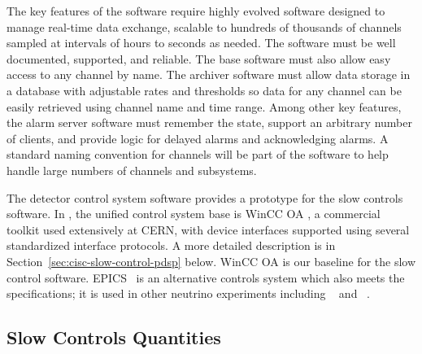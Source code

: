 The key features of the software require highly evolved software designed to manage real-time data exchange, scalable
to hundreds of thousands of channels sampled at intervals of hours to seconds as needed. The software
must be well documented, supported, and reliable. The base
software must also allow easy access to any channel by name. The
archiver software must allow data storage in a database with
adjustable rates and thresholds so data
for any channel can be easily retrieved using channel name and time range. Among other key
features, the alarm server software must remember the state, support an
arbitrary number of clients, and provide logic for delayed alarms and
acknowledging alarms. A standard naming
convention for channels will be part of the software to help handle large
numbers of channels and subsystems.

The  detector control system software \cite{pdspdcs_proc} provides a prototype for %
the  slow controls software.
In , the unified control system base is WinCC OA \cite{winccoa}, a
commercial toolkit used extensively at CERN, with device interfaces
supported using several standardized interface protocols. A more detailed description is in Section~\ref{sec:cisc-slow-control-pdsp} below.
WinCC OA is our baseline for the  slow control software.
EPICS~\cite{epics7} is an alternative controls system which also meets the specifications; it is used in other neutrino experiments including ~\cite{microboone} and ~\cite{Lukhanin:2012fp}. 


\subsection{Slow Controls Quantities}
\label{sec:fdgen-slow-cryo-quant}


